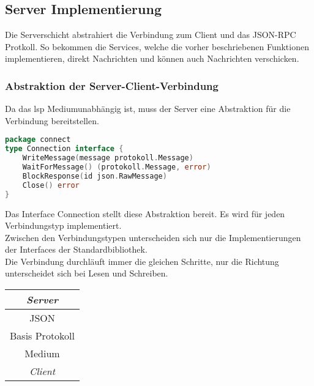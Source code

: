 \documentclass[./einleitung.tex]{subfiles}
\begin{document}
    \subsection{Server Implementierung}\label{subsec:server-implementierung}
    Die Serverschicht abstrahiert die Verbindung zum Client und das JSON-RPC Protkoll.
    So bekommen die Services, welche die vorher beschriebenen Funktionen implementieren, direkt Nachrichten und können auch Nachrichten verschicken.
    \subsubsection{Abstraktion der Server-Client-Verbindung}
    Da das \acrshort{lsp} Mediumunabhängig ist, muss der Server eine Abstraktion für die Verbindung bereitstellen.
    \begin{lstlisting}[language=Go]
package connect
type Connection interface {
	WriteMessage(message protokoll.Message)
	WaitForMessage() (protokoll.Message, error)
	BlockResponse(id json.RawMessage)
	Close() error
}
    \end{lstlisting}
    Das Interface Connection stellt diese Abstraktion bereit.
    Es wird für jeden Verbindungstyp implementiert.\\
    Zwischen den Verbindungstypen unterscheiden sich nur die Implementierungen der Interfaces der Standardbibliothek.\\
    Die Verbindung durchläuft immer die gleichen Schritte, nur die Richtung unterscheidet sich bei Lesen und Schreiben.
    \begin{center}
        \begin{center}
            \left\downarrow
            \left\uparrow
            \left\vspace{1cm}
            \begin{tabular}{|c|}
                \hline
                \textit{Server}\\
                \hline
                JSON\\
                \hline
                Basis Protokoll\\
                \hline
                Medium\\
                \hline
                \textit{Client}\\
                \hline
            \end{tabular}
        \end{center}
    \end{center}
\end{document}
